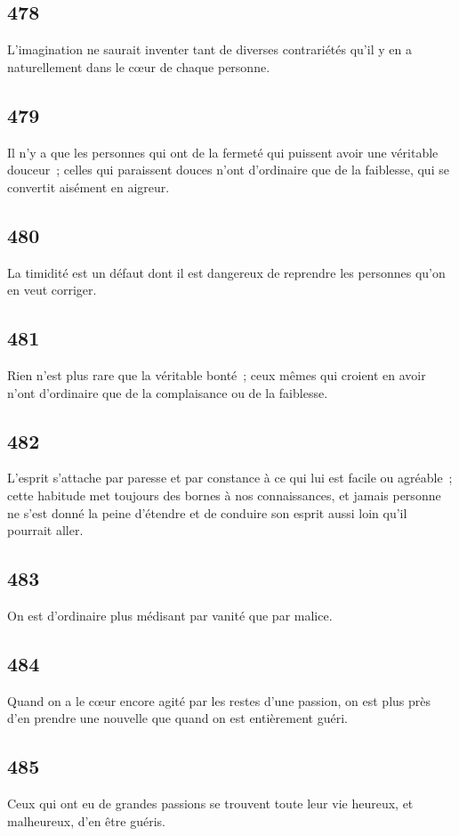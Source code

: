 \documentclass[french,twoside]{book} %
\begin{document}
\subsection[{478}]{ \textsc{478} }
\noindent L’imagination ne saurait inventer tant de diverses contrariétés qu’il y en a naturellement dans le cœur de chaque personne.
\subsection[{479}]{ \textsc{479} }
\noindent Il n’y a que les personnes qui ont de la fermeté qui puissent avoir une véritable douceur ; celles qui paraissent douces n’ont d’ordinaire que de la faiblesse, qui se convertit aisément en aigreur.
\subsection[{480}]{ \textsc{480} }
\noindent La timidité est un défaut dont il est dangereux de reprendre les personnes qu’on en veut corriger.
\subsection[{481}]{ \textsc{481} }
\noindent Rien n’est plus rare que la véritable bonté ; ceux mêmes qui croient en avoir n’ont d’ordinaire que de la complaisance ou de la faiblesse.
\subsection[{482}]{ \textsc{482} }
\noindent L’esprit s’attache par paresse et par constance à ce qui lui est facile ou agréable ; cette habitude met toujours des bornes à nos connaissances, et jamais personne ne s’est donné la peine d’étendre et de conduire son esprit aussi loin qu’il pourrait aller.
\subsection[{483}]{ \textsc{483} }
\noindent On est d’ordinaire plus médisant par vanité que par malice.
\subsection[{484}]{ \textsc{484} }
\noindent Quand on a le cœur encore agité par les restes d’une passion, on est plus près d’en prendre une nouvelle que quand on est entièrement guéri.
\subsection[{485}]{ \textsc{485} }
\noindent Ceux qui ont eu de grandes passions se trouvent toute leur vie heureux, et malheureux, d’en être guéris.
\end{document}
